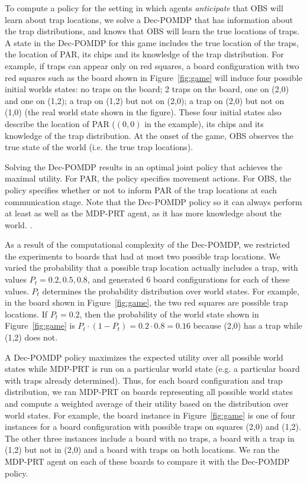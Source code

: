 To compute a policy for the setting in which agents \emph{anticipate} that OBS will learn about trap locations, we solve a Dec-POMDP that has information about the trap distributions, and knows that  OBS will learn the true locations of traps.  A state in the Dec-POMDP for this game includes the true location of the traps, the location of  PAR, its chips and its knowledge of the trap distribution. For example, if traps can appear only on red squares, a board configuration with two red squares such as the board shown in Figure~\ref{fig:game} will induce four possible initial worlds states: no traps on the board; 2 traps on the board, one on (2,0) and one on (1,2); a trap on (1,2) but not on (2,0); a trap on (2,0) but not on (1,0) (the real world state shown in the figure). These four initial states also describe the location of  PAR ($(0,0)$ in the example), its chips and its knowledge of the trap distribution. At the onset of the game,  OBS observes the true state of the world (i.e. the true trap locations). 
  
 Solving the Dec-POMDP results in an optimal joint policy that achieves the maximal utility. For  PAR, the policy specifies movement actions. For  OBS, the policy specifies whether or not to inform  PAR of the trap locations at each communication stage.  Note that the Dec-POMDP policy so it can  always perform at least as well as the MDP-PRT agent, as it has more knowledge about the world.
. 
   
As a result of the computational complexity of the Dec-POMDP, we restricted the experiments to boards that had at most two possible trap locations.
We varied the probability that a possible trap location  actually includes a trap, with values  $P_t = 0.2, 0.5, 0.8$, and generated 6 board configurations for each of these values. $P_t$  determines the probability distribution over world states. For example, in the board shown in Figure~\ref{fig:game}, the two red squares are possible trap locations. If $P_t = 0.2$, then the probability of the world state shown in Figure~\ref{fig:game}  is $P_t \cdot (1-P_t)=0.2 \cdot 0.8=0.16$ because (2,0) has a trap while (1,2) does not.
 
 
   A Dec-POMDP policy maximizes the expected utility over all possible world states while MDP-PRT is run on a particular world state (e.g. a particular board with traps already determined). Thus, for each board configuration and trap distribution, we ran MDP-PRT on boards representing all possible world states and compute a weighted average of their utility based on the distribution over world states. For example, the board instance in Figure~\ref{fig:game} is one of four instances for a board configuration with possible traps on squares (2,0) and (1,2). The other three instances include a board with no traps, a board with a trap in (1,2) but not in (2,0) and a board with traps on both locations.   We ran the MDP-PRT agent on each of these boards to compare it with the Dec-POMDP policy.

